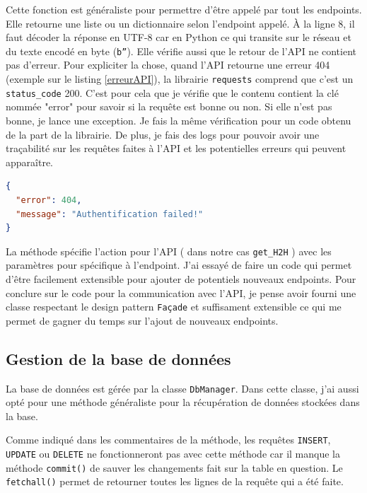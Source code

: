 \documentclass[a4paper,14pt]{extarticle}
\begin{document}
{Cette fonction est généraliste pour permettre d'être appelé par tout les endpoints. Elle retourne une liste ou un dictionnaire selon l'endpoint appelé. À la ligne 8, il faut décoder la réponse en UTF-8 car en Python ce qui transite sur le réseau et du texte encodé en byte (\texttt{b''}). 
Elle vérifie aussi que le retour de l'API ne contient pas d'erreur. Pour expliciter la chose, quand l'API retourne une erreur 404 (exemple sur le listing \ref{erreurAPI}), la librairie \texttt{requests} comprend que c'est un \texttt{status\_code} 200. C'est pour cela que je vérifie que le contenu contient la clé nommée "error" pour savoir si la requête est bonne ou non. Si elle n'est pas bonne, je lance une exception. Je fais la même vérification pour un code obtenu de la part de la librairie.
De plus, je fais des logs pour pouvoir avoir une traçabilité sur les requêtes faites à l'API et les potentielles erreurs qui peuvent apparaître.

\begin{lstlisting}[language=json, firstnumber=1, caption=Retour d'une erreur de l'API, captionpos=b, label=erreurAPI]
{
  "error": 404,
  "message": "Authentification failed!"
}
\end{lstlisting}


La méthode spécifie l'action pour l'API ( dans notre cas \texttt{get\_H2H} ) avec les paramètres pour spécifique à l'endpoint.
J'ai essayé de faire un code qui permet d'être facilement extensible pour ajouter de potentiels nouveaux endpoints. Pour conclure sur le code pour la communication avec l'API, je pense avoir fourni une classe respectant le design pattern \texttt{Façade} et suffisament extensible ce qui me permet de gagner du temps sur l'ajout de nouveaux endpoints.

\subsection{Gestion de la base de données}

La base de données est gérée par la classe \texttt{DbManager}. Dans cette classe, j'ai aussi opté pour une méthode généraliste pour la récupération de données stockées dans la base.


Comme indiqué dans les commentaires de la méthode, les requêtes \texttt{INSERT}, \texttt{UPDATE} ou \texttt{DELETE} ne fonctionneront pas avec cette méthode car il manque la méthode \texttt{commit()} de sauver les changements fait sur la table en question. Le \texttt{fetchall()} permet de retourner toutes les lignes de la requête qui a été faite.

}
\end{document}
